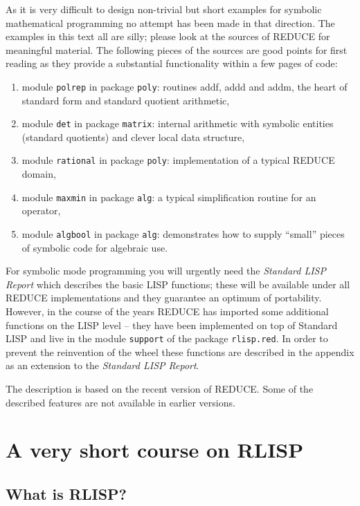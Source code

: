 \documentclass[11pt]{article}
\newcommand{\reduce}{\small REDUCE}
\begin{document}
As it is very difficult to design non-trivial but short
examples for symbolic mathematical programming no
attempt has been made in that direction. The examples
in this text all are silly; please look at the
sources of {\reduce} for meaningful material. The following pieces
of the sources are good points for first reading as they
provide a substantial functionality within a few pages
of code:
\begin{enumerate}
\item module \texttt{polrep} in package \texttt{poly}: routines
   addf, addd and addm, the heart of standard form and
   standard quotient arithmetic,
\item module \texttt{det} in package \texttt{matrix}: internal
   arithmetic with symbolic entities (standard quotients)
   and clever local data structure,
\item module \texttt{rational} in package \texttt{poly}: implementation
   of a typical {\reduce} domain,
\item module \texttt{maxmin} in package \texttt{alg}: a typical
   simplification routine for an operator,
\item module \texttt{algbool} in package \texttt{alg}: demonstrates
   how to supply ``small'' pieces of symbolic code for
   algebraic use.
\end{enumerate}

For symbolic mode programming you will urgently need the
\emph{Standard LISP Report} which describes
the basic LISP functions; these will be available under all
{\reduce} implementations and they guarantee an optimum
of portability. However, in the course of the
years {\reduce} has imported some additional functions on the
LISP level -- they have been implemented on top of Standard LISP
and live in the module \texttt{support} of
the package \texttt{rlisp.red}.
In order to prevent the reinvention of the wheel these functions
are described in the appendix as an extension to the
\emph{Standard LISP Report}.

The description is based on the recent version of REDUCE. Some of the
described features are not available in earlier versions.

\section{A very short course on RLISP}

\subsection{What is RLISP?}
\end{document}
